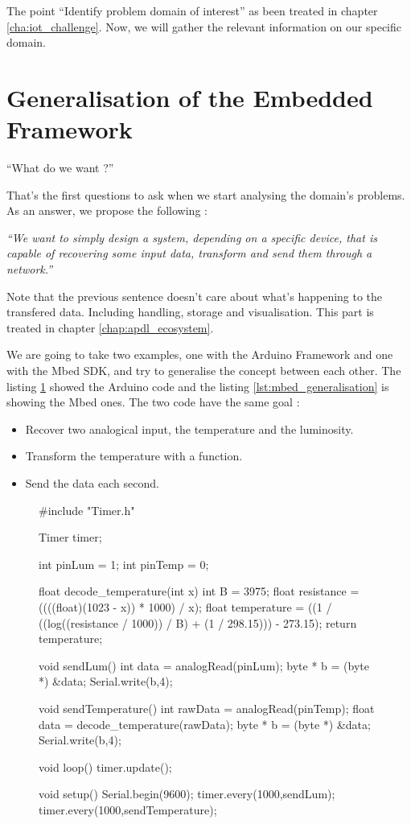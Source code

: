 The point ``Identify problem domain of interest'' as been treated in chapter
\ref{cha:iot_challenge}. Now, we will gather the relevant information on our
specific domain.

\section{Generalisation of the Embedded Framework}
\label{sec:generalisation_framework}

``What do we want ?''

That's the first questions to ask when we start analysing the domain's problems.
As an answer, we propose the following :

{ \Large \textit{``We want to simply design a system, depending on a specific
    device, that is capable of recovering some input data, transform and
    send them through a network.''}
}

Note that the previous sentence doesn't care about what's happening to the
transfered data. Including handling, storage and visualisation. This part is
treated in chapter \ref{chap:apdl_ecosystem}.

We are going to take two examples, one with the Arduino Framework and one with
the Mbed SDK, and try to generalise the concept between each other. The listing
\ref{lst:arduino_generalisation} showed the Arduino code and the listing
\ref{lst:mbed_generalisation} is showing the Mbed ones. The two code have the
same goal :

\begin{itemize}
\item Recover two analogical input, the temperature and the luminosity.
\item Transform the temperature with a function.
\item Send the data each second.
\end{itemize}

\begin{figure}[ht]
  \centering
\begin{scalacode}
#include "Timer.h"

Timer timer;

int pinLum = 1;
int pinTemp = 0;

float decode_temperature(int x){
  int B = 3975;
  float resistance = ((((float)(1023 - x)) * 1000) / x);
  float temperature = ((1 / ((log((resistance / 1000)) / B) + (1 / 298.15))) - 273.15);
  return temperature;
}

void sendLum(){
  int data = analogRead(pinLum);
  byte * b = (byte *) &data;
  Serial.write(b,4);
}

void sendTemperature(){
  int rawData = analogRead(pinTemp);
  float data = decode_temperature(rawData);
  byte * b = (byte *) &data;
  Serial.write(b,4);
}

void loop() {
  timer.update();
}

void setup() {
  Serial.begin(9600);
  timer.every(1000,sendLum);
  timer.every(1000,sendTemperature);
}
\end{scalacode}
  \caption[Arduino code for a simple data recovering]{}
  \label{lst:arduino_generalisation}
\end{figure}

